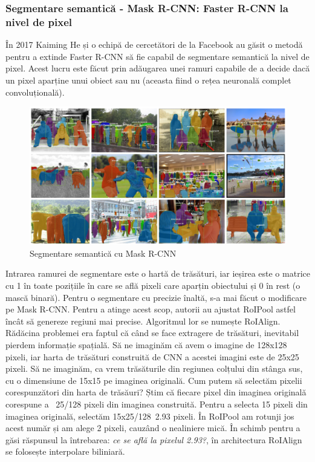 \subsubsection{Segmentare semantică - Mask R-CNN: Faster R-CNN la nivel de pixel}
În 2017 Kaiming He și o echipă de cercetători de la Facebook au găsit o metodă pentru a extinde Faster R-CNN să fie capabil de segmentare semantică la nivel de pixel. Acest lucru este făcut prin adăugarea unei ramuri capabile de a decide dacă un pixel aparține unui obiect sau nu (aceasta fiind o rețea neuronală complet convoluțională).
\begin{figure}[h!]
    	\centering
	\captionsetup{justification=centering, margin=2cm}
	\includegraphics[width=1.0\textwidth]{figures/image_segmentation_results_mrcnn.png}
	\caption{Segmentare semantică cu Mask R-CNN \cite{DBLP:journals/corr/HeGDG17}}
	\label{fig:segmentare_semantica cu Mask R-CNN}
\end{figure}
Intrarea ramurei de segmentare este o hartă de trăsături, iar ieșirea este o matrice cu 1 în toate pozițiile în care se află pixeli care aparțin obiectului și 0 în rest (o mască binară). Pentru o segmentare cu precizie înaltă, s-a mai făcut o modificare pe Mask R-CNN. Pentru a atinge acest scop, autorii au ajustat RoIPool astfel încât să genereze regiuni mai precise. Algoritmul lor se numește RoIAlign.\newline
Rădăcina problemei era faptul că când se face extragere de trăsături, inevitabil pierdem informație spațială. Să ne imaginăm că avem o imagine de 128x128 pixeli, iar harta de trăsături construită de CNN a acestei imagini este de 25x25 pixeli. Să ne imaginăm, ca vrem trăsăturile din regiunea colțului din stânga sus, cu o dimensiune de 15x15 pe imaginea originală. Cum putem să selectăm pixelii corespunzători din harta de trăsăuri? Știm că fiecare pixel din imaginea originală corespune a ~25/128 pixeli din imaginea construită. Pentru a selecta 15 pixeli din imaginea originală, selectăm 15x25/128~2.93 pixeli.\newline
În RoIPool am rotunji jos acest număr și am alege 2 pixeli, cauzând o nealiniere mică. În schimb pentru a găsi răspunsul la întrebarea: \textit{ce se află la pixelul 2.93?}, în architectura RoIAlign se folosește interpolare biliniară.